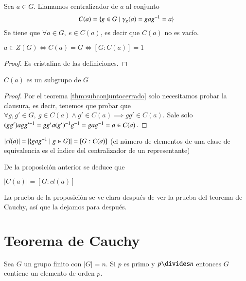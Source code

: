 \begin{dfn}
	\label{dfn:centralizador}
	Sea $a \in G$. Llamamos centralizador de $a$ al conjunto
	\begin{align}
	C(a) = \{g \in G \mid \gamma_g(a) = g a g^{-1} = a\}
	\end{align}
	Se tiene que $\forall a \in G,\ e \in C(a)$, es decir que $C(a)$ no es vacío.
\end{dfn}

\begin{pro}
	$a \in Z(G) \iff C(a) = G \iff [G:C(a)] = 1$
\end{pro}

\begin{proof}
	Es cristalina de las definiciones.
\end{proof}

\begin{pro}
	$C(a)$ es un subgrupo de $G$
\end{pro}

\begin{proof}
	Por el teorema \ref{thm:subconjuntocerrado} solo necesitamos probar la clausura, es decir, tenemos que probar que $\forall g,g' \in G,\ g \in C(a) \land g' \in C(a) \implies gg' \in C(a)$. Sale solo $(gg')agg'^{-1} = gg'a(g')^{-1}g^{-1} = gag^{-1} = a \in C(a)$.
\end{proof}

\begin{pro}
	\label{pro:cardinalcajas}
	$|cl(a)| = |\{gag^{-1} \mid g \in G\}| = [G:C(a)]$ (el número de elementos de una clase de equivalencia es el índice del centralizador de un representante)
\end{pro}

De la proposición anterior se deduce que

\begin{cor}
	$|C(a)| = [G:cl(a)]$
\end{cor}

La prueba de la proposición se ve clara después de ver la prueba del teorema de Cauchy, así que la dejamos para después.


\section{Teorema de Cauchy}

\begin{thm}[de Cauchy]
	\label{thm:cauchy}
	Sea $G$ un grupo finito con $|G| = n$. Si $p$ es primo y $p\divides n$ entonces $G$ contiene un elemento de orden $p$.
\end{thm}

